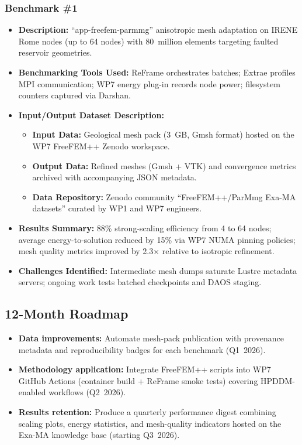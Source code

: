 \subsubsection{Benchmark \#1}
\begin{itemize}
    \item \textbf{Description:} ``app-freefem-parmmg'' anisotropic mesh adaptation on IRENE Rome nodes (up to 64 nodes) with $80$~million elements targeting faulted reservoir geometries.
    \item \textbf{Benchmarking Tools Used:} ReFrame orchestrates batches; Extrae profiles MPI communication; WP7 energy plug-in records node power; filesystem counters captured via Darshan.
    \item \textbf{Input/Output Dataset Description:}
        \begin{itemize}
            \item \textbf{Input Data:} Geological mesh pack (3~GB, Gmsh format) hosted on the WP7 FreeFEM++ Zenodo workspace.
            \item \textbf{Output Data:} Refined meshes (Gmsh + VTK) and convergence metrics archived with accompanying JSON metadata.
            \item \textbf{Data Repository:} Zenodo community ``FreeFEM++/ParMmg Exa-MA datasets'' curated by WP1 and WP7 engineers.
        \end{itemize}
    \item \textbf{Results Summary:} 88\% strong-scaling efficiency from 4 to 64 nodes; average energy-to-solution reduced by 15\% via WP7 NUMA pinning policies; mesh quality metrics improved by 2.3× relative to isotropic refinement.
    \item \textbf{Challenges Identified:} Intermediate mesh dumps saturate Lustre metadata servers; ongoing work tests batched checkpoints and DAOS staging.
\end{itemize}

\subsection{12-Month Roadmap}
\label{sec:WP7:Freefem++:roadmap}

\begin{itemize}
    \item \textbf{Data improvements:} Automate mesh-pack publication with provenance metadata and reproducibility badges for each benchmark (Q1~2026).
    \item \textbf{Methodology application:} Integrate FreeFEM++ scripts into WP7 GitHub Actions (container build + ReFrame smoke tests) covering HPDDM-enabled workflows (Q2~2026).
    \item \textbf{Results retention:} Produce a quarterly performance digest combining scaling plots, energy statistics, and mesh-quality indicators hosted on the Exa-MA knowledge base (starting Q3~2026).
\end{itemize}